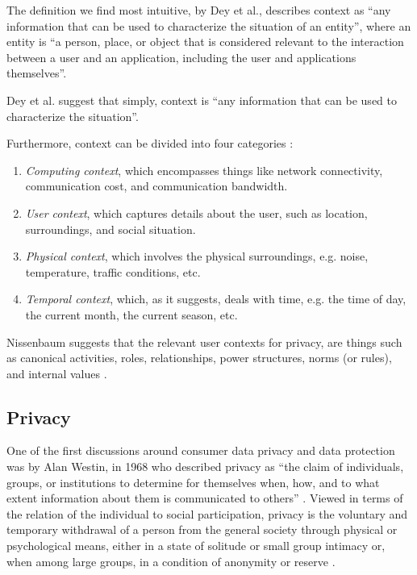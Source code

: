 \documentclass{sigchi}
\begin{document}
The definition we find most intuitive, by Dey et al., describes context as ``any information that can be used to characterize the situation of an entity'', where an entity is ``a person, place, or object that is considered relevant to the interaction between a user and an application, including the user and applications themselves''\cite{abowd1999towards}.

Dey et al. suggest that simply, context is ``any information that can be used to characterize the situation''.

Furthermore, context can be divided into four categories \cite{chen2000survey}:

\begin{enumerate}
\item \textit{Computing context}, which encompasses things like network connectivity, communication cost, and communication bandwidth.

\item \textit{User context}, which captures details about the user, such as location, surroundings, and social situation.

\item \textit{Physical context}, which involves the physical surroundings, e.g. noise, temperature, traffic conditions, etc.

\item \textit{Temporal context}, which, as it suggests, deals with time, e.g. the time of day, the current month, the current season, etc.

\end{enumerate}

Nissenbaum suggests that the relevant user contexts for privacy, are things such as canonical activities, roles, relationships, power structures, norms (or rules), and internal values \cite{nissenbaum2009privacy}.

\subsection{Privacy}

One of the first discussions around consumer data privacy and data protection was by Alan Westin, in 1968 who described privacy as ``the claim of individuals, groups, or institutions to determine for themselves when, how, and to what extent information about them is communicated to others'' \cite{westin1968privacy}. Viewed in terms of the relation of the individual to social participation, privacy is the voluntary and temporary withdrawal of a person from the general society through physical or psychological means, either in a state of solitude or small group intimacy or, when among large groups, in a condition of anonymity or reserve
\cite{westin1968privacy}.
\end{document}
